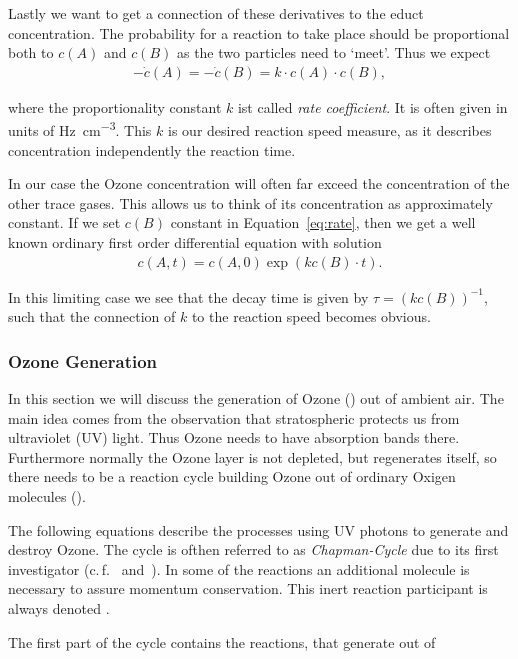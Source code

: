 Lastly we want to get a connection of these derivatives to the educt
concentration. The probability for a reaction to take place should be
proportional both to $c(A)$ and $c(B)$ as the two particles need to
`meet'. Thus we expect
\begin{align}
  -\dot c(A) = - \dot c(B) = k \cdot c(A) \cdot c(B), \label{eq:rate}
\end{align}

where the proportionality constant $k$ ist called \emph{rate
  coefficient}. It is often given in units of
\si{\hertz\per\cubic\centi\meter}. This $k$ is our desired reaction
speed measure, as it describes concentration independently the
reaction time. 

In our case the Ozone concentration will often far exceed the
concentration of the other trace gases. This allows us to think of its
concentration as approximately constant. If we set $c(B)$ constant in
Equation~\eqref{eq:rate}, then we get a well known ordinary first
order differential equation with solution
\begin{align*}
  c(A,t) = c(A,0)\exp(kc(B)\cdot t).
\end{align*}

In this limiting case we see that the decay time is given by $\tau =
(kc(B))^{-1}$, such that the connection of $k$ to the reaction speed
becomes obvious.

\subsubsection{Ozone Generation}
\label{sec:theory-ozone}

In this section we will discuss the generation of Ozone () out of ambient
air. The main idea comes from the observation that stratospheric
 protects us from ultraviolet (UV) light. Thus Ozone needs to
have absorption bands there. Furthermore normally the Ozone layer is
not depleted, but regenerates itself, so there needs to be a reaction
cycle building Ozone out of ordinary Oxigen molecules ().

The following equations describe the processes using UV photons to
generate and destroy Ozone. The cycle is ofthen referred to as
\emph{Chapman-Cycle} due to its first investigator
(c.\,f.~\cite{chapman} and~\cite{roedel}). In
some of the reactions an additional molecule is necessary to assure
momentum conservation. This inert reaction participant is always
denoted .

The first part of the cycle contains the reactions, that generate
 out of 


